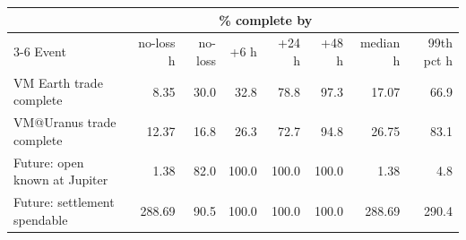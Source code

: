 \par\noindent
\begin{tabular}{lrrrrrrr}
\toprule
 & & \multicolumn{4}{c}{\% complete by} & & \\
\cmidrule(lr){3-6}
Event & no-loss h & no-loss & +6 h & +24 h & +48 h & median h & 99th pct h\\
\midrule
VM Earth trade complete & 8.35 & 30.0 & 32.8 & 78.8 & 97.3 & 17.07 & 66.9\\
VM@Uranus trade complete & 12.37 & 16.8 & 26.3 & 72.7 & 94.8 & 26.75 & 83.1\\
Future: open known at Jupiter & 1.38 & 82.0 & 100.0 & 100.0 & 100.0 & 1.38 & 4.8\\
Future: settlement spendable & 288.69 & 90.5 & 100.0 & 100.0 & 100.0 & 288.69 & 290.4\\
\bottomrule
\end{tabular}\par
